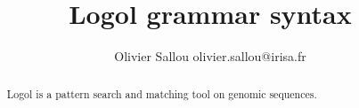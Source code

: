 \documentclass[11pt]{article}
\begin{document}
\title{%
    Logol grammar syntax}
\author{%
    Olivier Sallou
    olivier.sallou@irisa.fr}

\maketitle

\begin{abstract}
 Logol is a pattern search and matching tool on genomic sequences.
\end{abstract}

\tableofcontents
\end{document}
